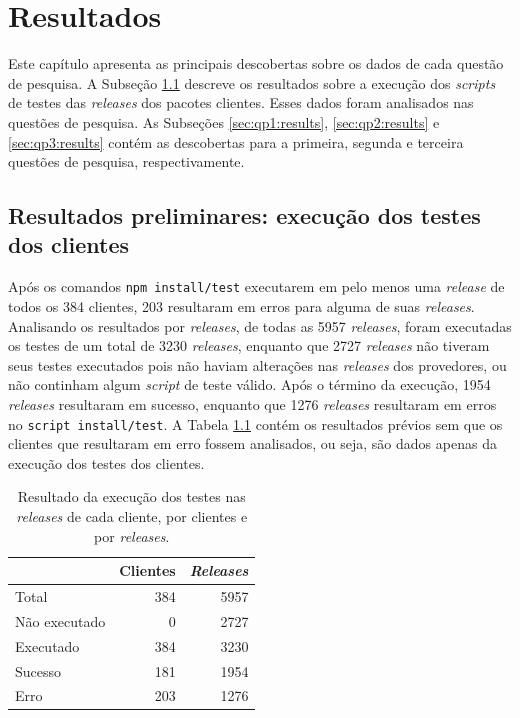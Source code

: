 \chapter{Resultados}
\label{cap:results}
Este capítulo apresenta as principais descobertas sobre os dados de cada questão de pesquisa. A Subseção \ref{sec:col_dados} descreve os resultados sobre a execução dos \textit{scripts} de testes das \textit{releases} dos pacotes clientes. Esses dados foram analisados nas questões de pesquisa. As Subseções \ref{sec:qp1:results}, \ref{sec:qp2:results} e \ref{sec:qp3:results} contém as descobertas para a primeira, segunda e terceira questões de pesquisa, respectivamente.


\section{Resultados preliminares: execução dos testes dos clientes}
\label{sec:col_dados}

Após os comandos \texttt{npm install/test} executarem em pelo menos uma \textit{release} de todos os 384 clientes, 203 resultaram em erros para alguma de suas \textit{releases}. Analisando os resultados por \textit{releases}, de todas as 5957 \textit{releases}, foram executadas os testes de um total de 3230 \textit{releases}, enquanto que 2727 \textit{releases} não tiveram seus testes executados pois não haviam alterações nas \textit{releases} dos provedores, ou não continham algum \textit{script} de teste válido. Após o término da execução, 1954 \textit{releases} resultaram em sucesso, enquanto que 1276 \textit{releases} resultaram em erros no \texttt{script install/test}. A Tabela \ref{tab:res_rq1_1} contém os resultados prévios sem que os clientes que resultaram em erro fossem analisados, ou seja, são dados apenas da execução dos testes dos clientes.

\begin{table}
\centering
\begin{tabular}{lrr}
\toprule
                    & Clientes & \textit{Releases} \\ \hline
    Total           & 384     & 5957     \\
    Não executado   & 0       & 2727     \\
    Executado       & 384     & 3230     \\
    Sucesso         & 181     & 1954     \\
    Erro            & 203     & 1276     \\ \bottomrule
\end{tabular}

\caption{Resultado da execução dos testes nas \textit{releases} de cada cliente, por clientes e por \textit{releases}.}
\label{tab:res_rq1_1}
\end{table}

